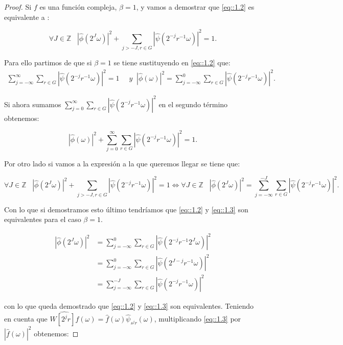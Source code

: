 \begin{proof}
\noindent Si $f$ es una función compleja, $\beta=1$, y vamos a demostrar que \eqref{eq::1.2} es equivalente a : 

\begin{equation} \label{eq::1.3}
  \forall J \in \mathbb{Z} \; \; \; \left|\widehat{\phi}\left(2^J\omega\right)\right|^2 + \sum_{j>-J,r\in G}\left|\widehat{\psi}\left(2^{-j}r^{-1}\omega\right)\right|^2=1.
\end{equation}

\noindent Para ello partimos de que si $\beta=1$ se tiene sustituyendo en \eqref{eq::1.2} que: 
     \begin{align*}
        \sum_{j=-\infty}^\infty \sum_{r \in G} |\widehat{\psi}(2^{-j}r^{-1}\omega)|^2=1 & \; \; y
        \;\;|\widehat{\phi}(\omega)|^2= \sum_{j=-\infty}^0 \sum_{r\in G} |\widehat{\psi}(2^{-j}r^{-1}\omega)|^2.
    \end{align*}

\noindent Si ahora sumamos $\sum_{j=0}^{\infty} \sum_{r\in G} |\widehat{\psi}(2^{-j}r^{-1}\omega)|^2$ en el segundo término obtenemos: 

$$|\widehat{\phi}(\omega)|^2 + \sum_{j=0}^{\infty} \sum_{r\in G} |\widehat{\psi}(2^{-j}r^{-1}\omega)|^2=1.$$

\noindent Por otro lado si vamos a la expresión a la que queremos llegar se tiene que: 

$$\forall J \in \mathbb{Z} \; \; \; \left|\widehat{\phi}\left(2^J\omega\right)\right|^2 + \sum_{j>-J,r\in G}\left|\widehat{\psi}\left(2^{-j}r^{-1}\omega\right)\right|^2=1 \iff \forall J \in \mathbb{Z} \; \; \; \left|\widehat{\phi}\left(2^J\omega\right)\right|^2=\sum_{j=-\infty}^{-J} \sum_{r\in G} |\widehat{\psi}(2^{-j}r^{-1}\omega)|^2.$$

\noindent Con lo que si demostramos esto último tendríamos que \eqref{eq::1.2} y \eqref{eq::1.3} son equivalentes para el caso $\beta=1$. 


     \begin{align*}
        \left|\widehat{\phi}\left(2^J\omega\right)\right|^2 & =\sum_{j=-\infty}^{0} \sum_{r\in G} |\widehat{\psi}(2^{-j}r^{-1}2^J\omega)|^2 \\
        & = \sum_{j=-\infty}^{0} \sum_{r\in G} |\widehat{\psi}(2^{J-j}r^{-1}\omega)|^2  \\
        & =\sum_{j=-\infty}^{-J} \sum_{r\in G} |\widehat{\psi}(2^{-j}r^{-1}\omega)|^2  
    \end{align*}
    
\noindent con lo que queda demostrado que \eqref{eq::1.2} y \eqref{eq::1.3} son equivalentes. Teniendo en cuenta que $\widehat{W\left[2^jr\right]f}(\omega)=\widehat{f}(\omega)\widehat{\psi}_{s^jr}(\omega)$, multiplicando \eqref{eq::1.3} por $|\widehat{f}(\omega)|^2$ obtenemos: 


\end{proof}
